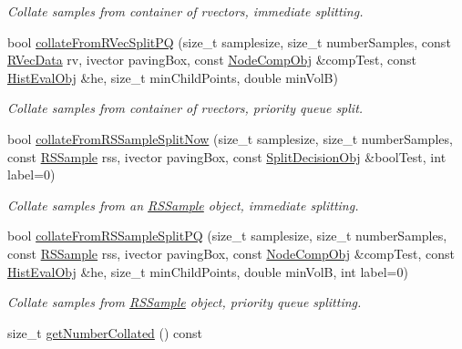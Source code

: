\begin{DoxyCompactItemize}
\begin{DoxyCompactList}\small\item\em \-Collate samples from container of rvectors, immediate splitting. \end{DoxyCompactList}\item 
bool \hyperlink{classsubpavings_1_1AdaptiveHistogramCollator_aa529397618b12232af3dc816957a5180}{collate\-From\-R\-Vec\-Split\-P\-Q} (size\-\_\-t samplesize, size\-\_\-t number\-Samples, const \hyperlink{namespacesubpavings_a30e15e24c8d81a2160d7422ef3c39d68}{\-R\-Vec\-Data} rv, ivector paving\-Box, const \hyperlink{classsubpavings_1_1NodeCompObj}{\-Node\-Comp\-Obj} \&comp\-Test, const \hyperlink{classsubpavings_1_1HistEvalObj}{\-Hist\-Eval\-Obj} \&he, size\-\_\-t min\-Child\-Points, double min\-Vol\-B)
\begin{DoxyCompactList}\small\item\em \-Collate samples from container of rvectors, priority queue split. \end{DoxyCompactList}\item 
bool \hyperlink{classsubpavings_1_1AdaptiveHistogramCollator_a2e8d1edcfe594020e1dfa8135dd20f9d}{collate\-From\-R\-S\-Sample\-Split\-Now} (size\-\_\-t samplesize, size\-\_\-t number\-Samples, const \hyperlink{classRSSample}{\-R\-S\-Sample} rss, ivector paving\-Box, const \hyperlink{classsubpavings_1_1SplitDecisionObj}{\-Split\-Decision\-Obj} \&bool\-Test, int label=0)
\begin{DoxyCompactList}\small\item\em \-Collate samples from an \hyperlink{classRSSample}{\-R\-S\-Sample} object, immediate splitting. \end{DoxyCompactList}\item 
bool \hyperlink{classsubpavings_1_1AdaptiveHistogramCollator_a3ba2c0211c575d8564050292e2b00640}{collate\-From\-R\-S\-Sample\-Split\-P\-Q} (size\-\_\-t samplesize, size\-\_\-t number\-Samples, const \hyperlink{classRSSample}{\-R\-S\-Sample} rss, ivector paving\-Box, const \hyperlink{classsubpavings_1_1NodeCompObj}{\-Node\-Comp\-Obj} \&comp\-Test, const \hyperlink{classsubpavings_1_1HistEvalObj}{\-Hist\-Eval\-Obj} \&he, size\-\_\-t min\-Child\-Points, double min\-Vol\-B, int label=0)
\begin{DoxyCompactList}\small\item\em \-Collate samples from \hyperlink{classRSSample}{\-R\-S\-Sample} object, priority queue splitting. \end{DoxyCompactList}\item 
size\-\_\-t \hyperlink{classsubpavings_1_1AdaptiveHistogramCollator_a37b31db56cc701fdd997eafb59bda4f5}{get\-Number\-Collated} () const 

\end{DoxyCompactItemize}
